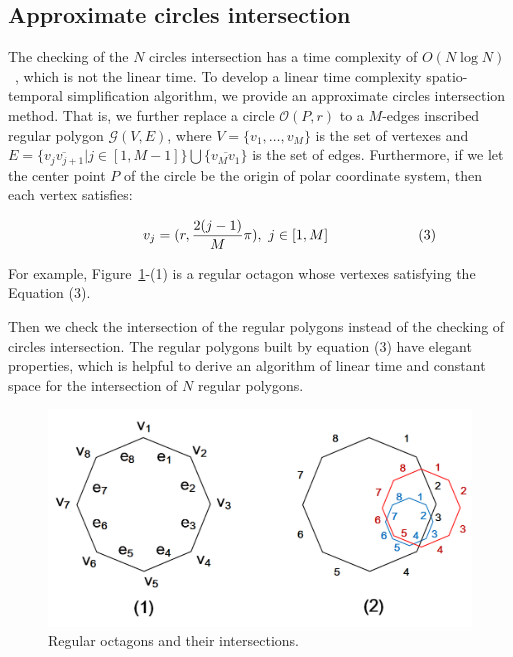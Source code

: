 \subsection{Approximate circles intersection}

The checking of the $N$ circles intersection has a time complexity of ${O(N\log N)}$~\cite{Shamos:Circle}, which is not the linear time.
To develop a linear time complexity spatio-temporal simplification algorithm, we provide an approximate circles intersection method.
That is, we further replace a circle $\mathcal{O}(P, r)$ to a $M$-edges inscribed regular polygon $\mathcal{G}(V, E)$, where $V=\{v_1,
\ldots, v_{M}\}$ is the set of vertexes and $E= \{\overline{v_jv_{j+1}}| j\in [1,M-1]\} \bigcup \{\overline{v_Mv_1}\}$ is the set of edges.
Furthermore, if we let the center point $P$ of the circle be the origin of polar coordinate system, then each vertex satisfies:

\vspace{-2ex}
\begin{equation*}
\label{equ-regular-polygon}
    \begin{aligned}
        \hspace{10ex}  v_j = (r, \frac{2(j-1)}{M}\pi), ~j \in [1, M]    \hspace{15ex} (3)\\
    \end{aligned}
\end{equation*}
\vspace{-2ex}




For example, Figure~\ref{fig:polygons}-(1) is a regular octagon whose vertexes satisfying the Equation (3).

%
Then we check the intersection of the regular polygons instead of the checking of circles intersection.
The regular polygons built by equation (3) have elegant properties, which is helpful to derive an algorithm of linear time and constant space
for the intersection of $N$ regular polygons.


\begin{figure}[tb!]
\centering
\includegraphics[scale=0.9]{figures/Fig-polygons.png}
\vspace{-1ex}
\caption{\small Regular octagons and their intersections.}
\vspace{-3ex}
\label{fig:polygons}
\end{figure}



